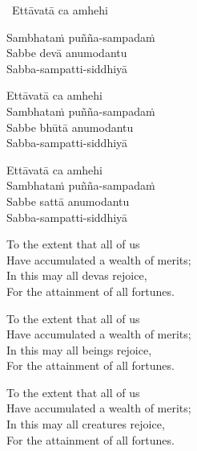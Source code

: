 \begin{leader-only}
  \anglebracketleft\ \hspace{-0.5mm}Ettāvatā ca amhehi \hspace{-0.5mm}\anglebracketright\
\end{leader-only}

\vspace{-0.99em}

Sambhataṁ puñña-sampadaṁ\\
Sabbe devā anumodantu\\
Sabba-sampatti-siddhiyā

Ettāvatā ca amhehi\\
Sambhataṁ puñña-sampadaṁ\\
Sabbe bhūtā anumodantu\\
Sabba-sampatti-siddhiyā

Ettāvatā ca amhehi\\
Sambhataṁ puñña-sampadaṁ\\
Sabbe sattā anumodantu\\
Sabba-sampatti-siddhiyā


\clearpage

\begin{english-verses}
  To the extent that all of us\\
  Have accumulated a wealth of merits;\\
  In this may all devas rejoice,\\
  For the attainment of all fortunes.
\end{english-verses}

\begin{english-verses}
  To the extent that all of us\\
  Have accumulated a wealth of merits;\\
  In this may all beings rejoice,\\
  For the attainment of all fortunes.
\end{english-verses}

\begin{english-verses}
  To the extent that all of us\\
  Have accumulated a wealth of merits;\\
  In this may all creatures rejoice,\\
  For the attainment of all fortunes.
\end{english-verses}


